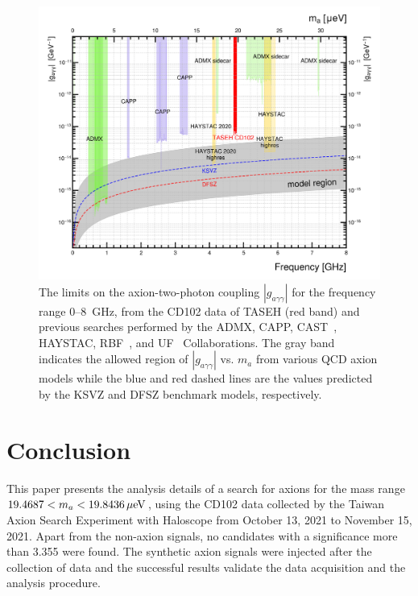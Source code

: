 \documentclass[%
reprint, %
superscriptaddress,
 amsmath,amssymb,
 aps
]{revtex4-2}
\begin{document}
\begin{figure} [htbp]
  \centering
 \includegraphics[width=12.9cm]{Figure11.png}
  \caption{The limits on the axion-two-photon coupling 
 $\left|g_{a\gamma\gamma}\right|$ for the frequency range 0--8~GHz, from the 
 CD102 data of TASEH (red band) and previous searches performed by the ADMX, 
 CAPP, CAST~\cite{CASTI,CASTII}, HAYSTAC, RBF~\cite{RBFI,RBFII}, and 
 UF~\cite{UF} Collaborations. The gray band indicates the allowed region 
 of $\left|g_{a\gamma\gamma}\right|$ vs. $m_a$ from various QCD axion 
models while the blue and red dashed lines are the values predicted by the 
KSVZ and DFSZ benchmark models, respectively.}
  \label{fig:gaggall}
\end{figure}


\section{Conclusion} \label{sec:conclusion}
This paper presents the analysis details of a search for axions for the mass 
range $19.4687 < m_a < 19.8436 \,\mu\text{e\hspace{-.08em}V}$, using the 
CD102 data collected by the Taiwan Axion Search Experiment with Haloscope 
from October 13, 2021 to November 15, 2021. 
Apart from the non-axion signals, no candidates with a significance more than
3.355 were found. The synthetic 
axion signals were injected after the collection of data and the 
successful results validate the data acquisition and the analysis procedure. 
\end{document}
